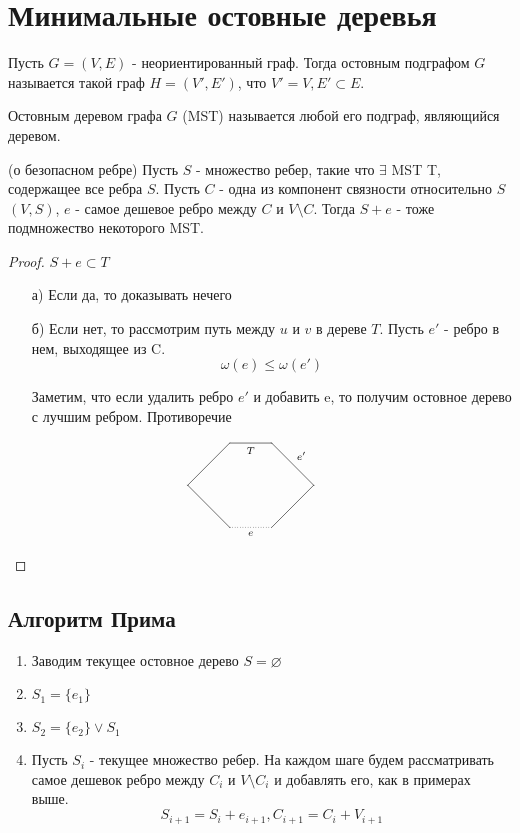 
\section{Минимальные остовные деревья}
\begin{definition}
  Пусть $G = (V, E)$ - неориентированный граф. Тогда остовным подграфом $G$ называется такой граф $H = (V', E')$, что $V' = V, E' \subset E$.
\end{definition}
\begin{definition}
  Остовным деревом графа $G$ (MST) называется любой его подграф, являющийся деревом.
\end{definition}

\begin{lemma}{(о безопасном ребре)}
  Пусть $S$ - множество ребер, такие что $\exists$ MST T, содержащее все ребра $S$. Пусть $C$ - одна из компонент связности относительно $S$ $(V, S)$, $e$ - самое дешевое ребро между $C$ и $V \setminus C $. Тогда $S + e$ - тоже подмножество некоторого MST.
\end{lemma}

\begin{proof}
  $S + e \subset T$
  \begin{enumerate}
    \item[а)] Если да, то доказывать нечего
    \item[б)] Если нет, то рассмотрим путь между $u$ и $v$ в дереве $T$. Пусть $e'$ - ребро в нем, выходящее из C.
    $$\omega(e) \le \omega(e')$$

    Заметим, что если удалить ребро $e'$ и добавить e, то получим остовное дерево с лучшим ребром. Противоречие
    
    
    $$\xymatrix{
    & & *={}\ar@{-}_{T}[r]&*={}\ar@{-}^{e'}[dr]&\\
    &*={}\ar@{-}[ru]&&&*={}\ar@{-}[dl]\\
    & &*={}\ar@{-}[lu] &*={}\ar@{.}^{e}[l] & & &}$$
  \end{enumerate}
\end{proof}

\subsection{Алгоритм Прима}

\begin{enumerate}
  \item Заводим текущее остовное дерево $S = \varnothing$
  \item $S_1 = \{e_1\}$
  \item $S_2 = \{e_2\} \vee S_1$
  \item Пусть $S_i$ - текущее множество ребер. На каждом шаге будем рассматривать самое дешевок ребро между $C_i$ и $V \setminus C_i$ и добавлять его, как в примерах выше.
  $$S_{i + 1} = S_i + e_{i + 1}, C_{i + 1} = C_i + V_{i + 1}$$
\end{enumerate}


